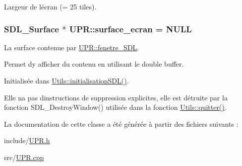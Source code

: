 Largeur de l\textquotesingle{}écran (= 25 tiles). 

\hypertarget{class_u_p_r_af6f9d806062f3d722ac9e16ac6946814}{}
\subsubsection[{surface\+\_\+ecran}]{\setlength{\rightskip}{0pt plus 5cm}S\+D\+L\+\_\+\+Surface $\ast$ U\+P\+R\+::surface\+\_\+ecran = N\+U\+L\+L\hspace{0.3cm}{\ttfamily [static]}}\label{class_u_p_r_af6f9d806062f3d722ac9e16ac6946814}


La surface contenue par \hyperlink{class_u_p_r_a337a823f61ad23359193a2d031d3376e}{U\+P\+R\+::fenetre\+\_\+\+S\+D\+L}. 

Permet d\textquotesingle{}y afficher du contenu en utilisant le double buffer.

Initialisée dans \hyperlink{class_utils_a65fa5f629d47909dcd35b7194a394df5}{Utils\+::initialisation\+S\+D\+L()}.

Elle n\textquotesingle{}a pas d\textquotesingle{}instructions de suppression explicites, elle est détruite par la fonction S\+D\+L\+\_\+\+Destroy\+Window() utilisée dans la fonction \hyperlink{class_utils_a1a1317e9deaac6dc1ad285d101b6f929}{Utils\+::quitter()}. 

La documentation de cette classe a été générée à partir des fichiers suivants \+:\begin{DoxyCompactItemize}
\item 
include/\hyperlink{_u_p_r_8h}{U\+P\+R.\+h}\item 
src/\hyperlink{_u_p_r_8cpp}{U\+P\+R.\+cpp}\end{DoxyCompactItemize}
